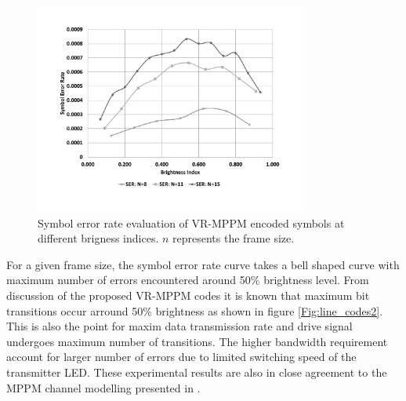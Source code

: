 \begin{figure}[!htbp]
	\centering
	\includegraphics[width=0.8\textwidth]{./Figures/Experiment}
	\caption[Hardware Performance Evaluation]{Symbol error rate evaluation of VR-MPPM encoded symbols at different brigness indices. $n$ represents the frame size.}
	\label{fig:fpgaExperiment}
\end{figure}

For a given frame size, the symbol error rate curve takes a bell shaped curve with maximum number of errors encountered around 50\% brightness level. From discussion of the proposed VR-MPPM codes it is known that maximum bit transitions occur arround 50\% brightness as shown in figure \ref{Fig:line_codes2}. This is also the point for maxim data transmission rate and drive signal undergoes maximum number of transitions. The higher bandwidth requirement account for larger number of errors due to limited switching speed of the transmitter LED.
These experimental results are also in close agreement to the MPPM channel modelling presented in \cite{hamkins2005multipulse}. 

%
%
%
%
%
%
%



